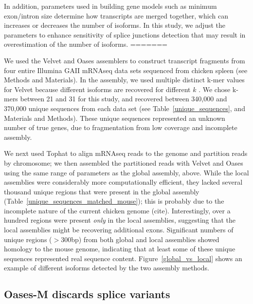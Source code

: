 \documentclass[10pt]{article}
\begin{document}
In addition, parameters used in building gene models such as minimum
exon/intron size determine how transcripts are merged together, which
can increases or decreases the number of isoforms.  In this study, we
adjust the parameters to enhance sensitivity of splice junctions
detection that may result in overestimation of the number of isoforms.
=======

We used the Velvet\cite{Zerbino:2008vu} and Oases\cite{Schulz:2012je}
assemblers to construct transcript fragments from four entire Illumina
GAII mRNAseq data sets sequenced from chicken spleen (see Methods and
Materials).  In the assembly, we used multiple distinct k-mer values
for Velvet because different isoforms are recovered for different $k$
\cite{Schulz:2012je}.  We chose k-mers between 21 and 31 for this
study, and recovered between 340,000 and 370,000 unique sequences from
each data set (see Table~\ref{unique_sequences}, and Materials and
Methods).  These unique sequences represented an unknown number of
true genes, due to fragmentation from low coverage and incomplete
assembly.

We next used Tophat to align mRNAseq reads to the genome and partition
reads by chromosome; we then assembled the partitioned reads with
Velvet and Oases using the same range of parameters as the global
assembly, above.  While the local assemblies were considerably more
computationally efficient, they lacked several thousand unique regions
that were present in the global assembly
(Table~\ref{unique_sequences_matched_mouse}); this is probably due to
the incomplete nature of the current chicken genome (cite).
Interestingly, over a hundred regions were present {\em only} in the
local assemblies, suggesting that the local assemblies might be
recovering additional exons.  Significant numbers of unique regions
($>300$bp) from both global and local assemblies showed homology to
the mouse genome, indicating that at least some of these unique sequences
represented real sequence content.  Figure~\ref{global_vs_local} shows
an example of different isoforms detected by the two assembly methods.


\subsection*{Oases-M discards splice variants}
\end{document}
